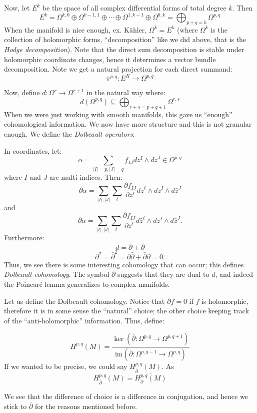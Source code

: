 \documentclass{book}
\newcommand{\sse}{\subseteq}
\begin{document}
Now, let $E^k$ be the space of all complex differential forms of total degree $k$. Then
\[
  E^k = \Omega^{k,0} \oplus \Omega^{k-1, 1}\oplus \cdots \oplus \Omega^{1, k-1}\oplus \Omega^{0,k}
  = \bigoplus_{p+q=k} \Omega^{p,q}
\]
When the manifold is nice enough, ex. K\"ahler, $\Omega^k = E^k$ (where $\Omega^k$ is the collection of
holomorphic forms, ``decomposition'' like we did above, that is the \emph{Hodge decomposition}). Note that the direct sum decomposition is stable under holomorphic coordinate changes, hence it determines
a vector bundle decomposition. Note we get a natural projection for each direct summand:
\[
  \pi^{p,q}: E^K \to \Omega^{p,q}
\]

Now, define $d: \Omega^r \to \Omega^{r+1}$ in the natural way where:
\[
  d(\Omega^{p,q}) \sse \bigoplus_{r+s=p+q+1} \Omega^{r,s}
\]
When we were just working with smooth manifolds, this gave us ``enough'' cohomological information. We now
have more structure and this is not granular enough. We define the \emph{Dolbeault operators}:

In coordinates, let:
\[
    \alpha = \sum_{|I|=p,|J|=q} f_{IJ} dz^I \wedge d\bar{z}^J \in \Omega^{p,q}
\]
where $I$ and $J$ are multi-indices. Then:
\[
    \partial\alpha = \sum_{|I|,|J|} \sum_\ell \frac{\partial f_{IJ}}{\partial z^\ell} dz^\ell \wedge dz^I \wedge d\bar{z}^J
\]
and
\[
    \bar{\partial}\alpha = \sum_{|I|,|J|} \sum_\ell \frac{\partial f_{IJ}}{\partial\bar{z}^\ell} d\bar{z}^\ell \wedge dz^I \wedge d\bar{z}^J.
\]
Furthermore:
\[
    d = \partial + \bar{\partial}
\]
\[
    \partial^2 = \bar{\partial}^2 = \partial\bar{\partial} + \bar{\partial}\partial = 0.
\]
Thus, we see there is some interesting cohomology that can occur; this defines \emph{Dolbeault cohomology}.
The symbol $\partial$ suggests that they are dual to $d$, and indeed the Poincar\'e lemma generalizes to
complex manifolds.

Let us define the Dolbeault cohomology. Notice that $\overline{\partial}f = 0$ if $f$ is holomorphic,
therefore it is in some sense the ``natural'' choice; the other choice keeping track of the
``anti-holomorphic'' information. Thus, define:

\[
H^{p,q}(M) = \frac{\ker(\overline{\partial}: \Omega^{p,q} \to \Omega^{p,q+1})}{\text{im}(\overline{\partial}: \Omega^{p,q-1} \to \Omega^{p,q})}
\]
If we wanted to be precise, we could say $H_{\overline{\partial}}^{p,q}(M)$. As
\[
  H_{\overline{\partial}}^{p,q}(M) = \overline{H_{\partial}^{p,q}(M)}
\]

We see that the difference of choice is a difference in conjugation, and hence we stick to
$\overline{\partial}$ for the reasons mentioned before.
\end{document}

